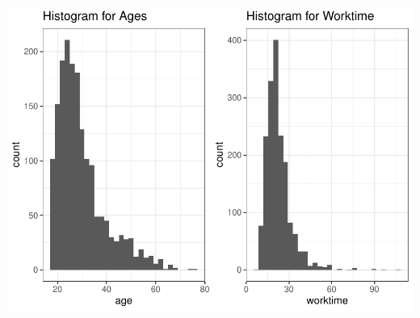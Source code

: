 \documentclass[
  12pt,
]{article}
\begin{document}
\includegraphics{hw1_sol_files/figure-latex/unnamed-chunk-2-1.pdf}
\end{document}
